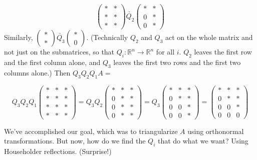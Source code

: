 \begin{equation*}
\begin{pmatrix}
* & * \\
* & * \\
* & * 
\end{pmatrix}
\underrightarrow{Q_2}
\begin{pmatrix}
* & * \\
0 & * \\
0 & * 
\end{pmatrix}
\end{equation*}
Similarly, $ \begin{pmatrix} * \\ * \end{pmatrix} \underrightarrow{Q_3} \begin{pmatrix} * \\ 0 \end{pmatrix} $.
(Technically $Q_2$ and $Q_3$ act on the whole matrix and not just on the submatrices, so that $Q_i: \mathbb{R}^n \rightarrow \mathbb{R}^n$ for all $i$.
$Q_2$ leaves the first row and the first column alone, and $Q_3$ leaves the first two rows and the first two columns alone.)
Then $Q_3 Q_2 Q_1 A =$

\begin{equation*}
Q_3 Q_2 Q_1
\begin{pmatrix}
* & * & * \\
* & * & * \\
* & * & * \\
* & * & *
\end{pmatrix}
= Q_3 Q_2
\begin{pmatrix}
* & * & * \\
0 & * & * \\
0 & * & * \\
0 & * & *
\end{pmatrix}
= Q_3
\begin{pmatrix}
* & * & * \\
0 & * & * \\
0 & 0 & * \\
0 & 0 & *
\end{pmatrix}
= 
\begin{pmatrix}
* & * & * \\
0 & * & * \\
0 & 0 & * \\
0 & 0 & 0
\end{pmatrix}
\end{equation*}

We've accomplished our goal, which was to triangularize $A$ using orthonormal transformations.
But now, how do we find the $Q_i$ that do what we want? Using Householder reflections.
(Surprise!)

